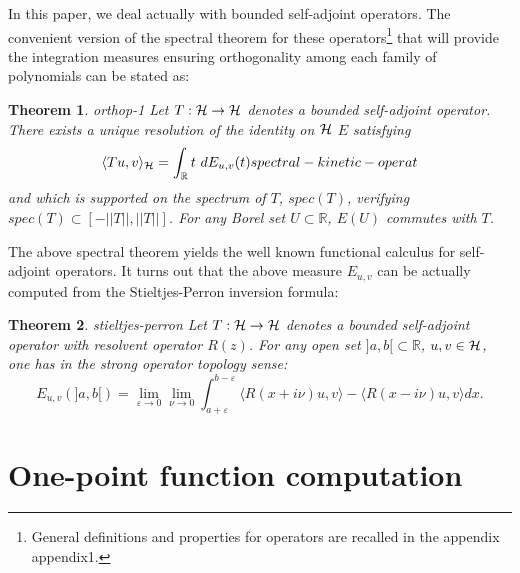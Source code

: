 \documentclass[10pt]{book}
\let\int\int
\theoremstyle{break}
\newtheorem{theorem}{Theorem}
\begin{document}
In this paper, we deal actually with bounded self-adjoint operators. The convenient version of the spectral theorem for these operators{\footnote{General definitions and properties for operators are recalled in the appendix {appendix1}.}} that will provide the integration measures ensuring orthogonality among each family of polynomials can be stated as:
\begin{theorem}{orthop-1}
Let $T:{\cal{H}}\to{\cal{H}}$ denotes a bounded self-adjoint operator. There exists a unique resolution of the identity on ${\cal{H}} $ $E$ satisfying 
\begin{equation}
\langle Tu,v \rangle_{\cal{H}}=\int_{\mathbb{R}}t\ dE_{u,v}(t){spectral-kinetic-operat}
\end{equation}
and which is supported on the spectrum of $T$, $spec(T)$, verifying $spec(T)\subset[-||T|| ,||T||]$. For any Borel set $U\subset\mathbb{R}$, $E(U)$ commutes with $T$.
\end{theorem}
The above spectral theorem yields the well known functional calculus for self-adjoint operators. It turns out that the above measure $E_{u,v}$ can be actually computed from the Stieltjes-Perron inversion formula:
\begin{theorem}{stieltjes-perron}
Let $T:{\cal{H}}\to{\cal{H}}$ denotes a bounded self-adjoint operator with resolvent operator $R(z)$. For any open set $]a,b[\subset\mathbb{R}$, $u,v\in\cal{H}$, one has in the strong operator topology sense:
\begin{equation}
E_{u,v}(]a,b[)=\lim_{\varepsilon\to0}\lim_{\nu\to0 }\int_{a+\varepsilon}^{b-\varepsilon}\langle R(x+i\nu)u,v \rangle-\langle R(x-i\nu)u,v \rangle dx.
\end{equation}
\end{theorem}



\section{One-point function computation}
\end{document}
